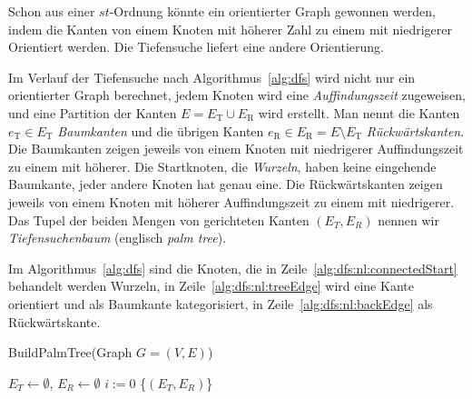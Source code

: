 \documentclass[a4paper]{scrreprt}
\theoremstyle{definition}
\begin{document}
Schon aus einer $st$-Ordnung könnte ein orientierter Graph gewonnen werden, indem die Kanten von einem Knoten mit höherer Zahl zu einem mit niedrigerer Orientiert werden. Die Tiefensuche liefert eine andere Orientierung.

Im Verlauf der Tiefensuche nach Algorithmus~\ref{alg:dfs} wird nicht nur ein orientierter Graph berechnet, jedem Knoten wird eine \emph{Auffindungszeit} zugeweisen, und eine Partition der Kanten $E = E_\text{T} \cup E_\text{R}$ wird erstellt. Man nennt die Kanten $e_\text{T} \in E_\text{T}$ \emph{Baumkanten} und die übrigen Kanten $e_\text{R} \in E_\text{R} =  E \setminus E_\text{T}$ \emph{Rückwärtskanten}. Die Baumkanten zeigen jeweils von einem Knoten mit niedrigerer Auffindungszeit zu einem mit höherer. Die Startknoten, die \emph{Wurzeln}, haben keine eingehende Baumkante, jeder andere Knoten hat genau eine. Die Rückwärtskanten zeigen jeweils von einem Knoten mit höherer Auffindungszeit zu einem mit niedrigerer. Das Tupel der beiden Mengen von gerichteten Kanten $(E_T, E_R)$ nennen wir \emph{Tiefensuchenbaum} (englisch \emph{palm tree}).

Im Algorithmus~\ref{alg:dfs} sind die Knoten, die in Zeile~\ref{alg:dfs:nl:connectedStart} behandelt werden Wurzeln, in Zeile~\ref{alg:dfs:nl:treeEdge} wird eine Kante orientiert und als Baumkante kategorisiert, in Zeile~\ref{alg:dfs:nl:backEdge} als Rückwärtskante.

\begin{algorithm}[ht]
  \caption{BuildPalmTree(Graph $G = (V,E)$)}
  \label{alg:dfs}
\BlankLine
  $E_T \leftarrow \emptyset$, $E_R \leftarrow \emptyset$ \;
  $i := 0$ \;
\BlankLine
\BlankLine
\BlankLine
    \Return\{$(E_T, E_R)$\}
\end{algorithm}
\end{document}
